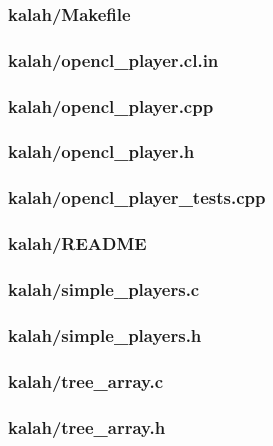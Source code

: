 \documentclass{article}
\begin{document}
\subsubsection*{kalah/Makefile}


\subsubsection*{kalah/opencl\_player.cl.in}


\subsubsection*{kalah/opencl\_player.cpp}


\subsubsection*{kalah/opencl\_player.h}


\subsubsection*{kalah/opencl\_player\_tests.cpp}


\subsubsection*{kalah/README}


\subsubsection*{kalah/simple\_players.c}


\subsubsection*{kalah/simple\_players.h}


\subsubsection*{kalah/tree\_array.c}


\subsubsection*{kalah/tree\_array.h}

\end{document}
